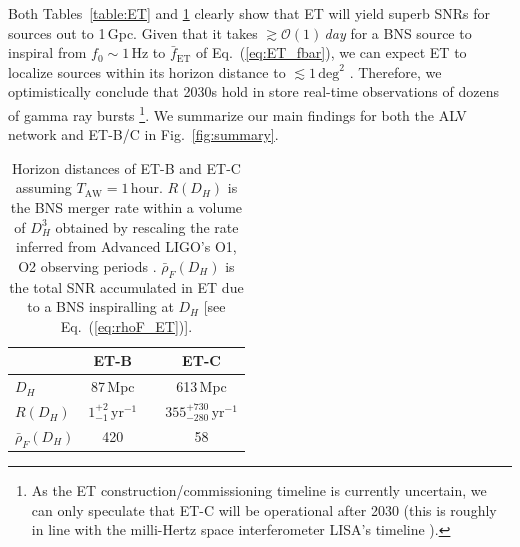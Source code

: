 \documentclass[prd,amsmath,amssymb,aps,floats,amsfonts,notitlepage,superscriptaddress,eqsecnum,nofootinbib,10pt]{revtex4-1}
\newcommand\T{\rule{0pt}{2.6ex}}       %
\newcommand\B{\rule[-1.2ex]{0pt}{0pt}} %
\begin{document}
Both Tables~\ref{table:ET} and \ref{table:horizon} clearly show that ET will yield superb SNRs for sources out to 1\,Gpc. Given that
it takes $\gtrsim \mathcal{O}(1)\,$\emph{day} for a BNS source to inspiral from $f_0\sim 1\,$Hz to $\bar{f}_\text{ET}$ of Eq.~(\ref{eq:ET_fbar}),
we can expect ET to localize sources within its horizon distance to $\lesssim 1\,\text{deg}^2$ \cite{Mills:2017urp}.
Therefore, we optimistically conclude that 2030s hold in store real-time observations of dozens of gamma ray bursts
\footnote{As the ET construction/commissioning timeline is currently uncertain, we can only speculate that ET-C will be operational after 2030 
(this is roughly in line with the milli-Hertz space interferometer LISA's timeline \cite{Audley:2017drz}).}.
%
We summarize our main findings for both the ALV network and ET-B/C in Fig.~\ref{fig:summary}.
%
%
%
\begin{table}[h]
\centering
\begin{tabular}{l|ccc}
\hline
 & ET-B & & ET-C\T\B\\
\hline
  $D_H $& 87\,Mpc& &{613\,Mpc}\T\\
  $R(D_H) $& $1^{+2}_{-1}\,\text{yr}^{-1}$&\hspace{5mm} &{$355^{+730}_{-280}\,\text{yr}^{-1}$}\T\\
  $\bar\rho_F(D_H)$ & 420 &&{58}\T\B\\
\hline
\end{tabular}
\caption{Horizon distances of ET-B and ET-C assuming $T_\text{AW} =1\,$hour. $R(D_H)$ is the BNS merger rate within a volume of $D_H^3$
obtained by rescaling the rate inferred from Advanced LIGO's O1, O2 observing periods \cite{GW170817}. $\bar\rho_F(D_H)$ is the total SNR accumulated in ET due to a BNS inspiralling at $D_H$ [see Eq.~(\ref{eq:rhoF_ET})].}\label{table:horizon}
\end{table}
%
%
%
\end{document}
